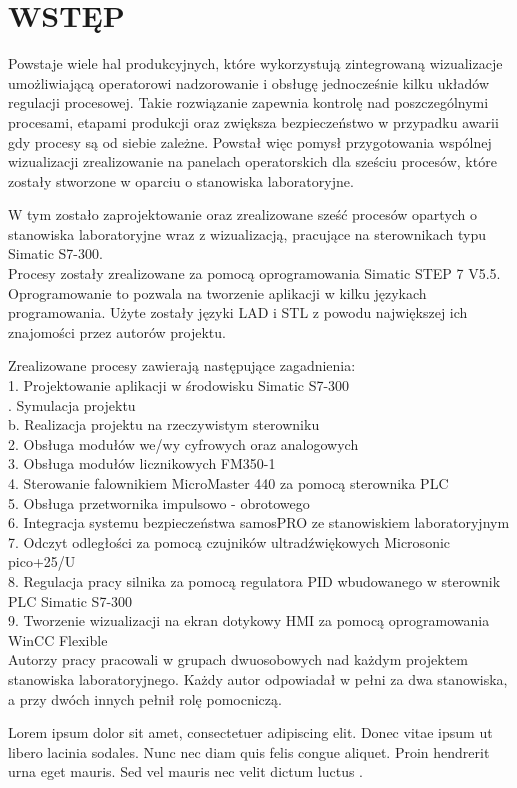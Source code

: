 \chapter{WSTĘP}



Powstaje wiele hal produkcyjnych, które wykorzystują zintegrowaną wizualizacje umożliwiającą operatorowi nadzorowanie i obsługę jednocześnie kilku układów regulacji procesowej. Takie rozwiązanie zapewnia kontrolę nad poszczególnymi procesami, etapami produkcji oraz zwiększa bezpieczeństwo w przypadku awarii gdy procesy są od siebie zależne. Powstał więc pomysł przygotowania wspólnej wizualizacji zrealizowanie na panelach operatorskich dla sześciu procesów, które zostały stworzone w oparciu o stanowiska laboratoryjne.

W tym zostało zaprojektowanie oraz zrealizowane sześć procesów opartych o stanowiska laboratoryjne wraz z wizualizacją, pracujące na sterownikach typu Simatic S7-300.
\\Procesy zostały zrealizowane za pomocą oprogramowania Simatic STEP 7 V5.5. Oprogramowanie to pozwala na tworzenie aplikacji w kilku językach programowania. Użyte zostały języki LAD i STL z powodu największej ich znajomości przez autorów projektu.

Zrealizowane procesy zawierają następujące zagadnienia:
\\1. Projektowanie aplikacji w środowisku Simatic S7-300\\
\a. Symulacja projektu\\
b. Realizacja projektu na rzeczywistym sterowniku\\
2. Obsługa modułów we/wy cyfrowych oraz analogowych\\
3. Obsługa modułów licznikowych FM350-1\\
4. Sterowanie falownikiem MicroMaster 440 za pomocą sterownika PLC\\
5. Obsługa przetwornika impulsowo - obrotowego\\
6. Integracja systemu bezpieczeństwa samosPRO ze stanowiskiem laboratoryjnym\\
7. Odczyt odległości za pomocą czujników ultradźwiękowych Microsonic pico+25/U\\
8. Regulacja pracy silnika za pomocą regulatora PID wbudowanego w sterownik PLC Simatic S7-300\\
9. Tworzenie wizualizacji na ekran dotykowy HMI za pomocą oprogramowania WinCC Flexible\\


Autorzy pracy pracowali w grupach dwuosobowych nad każdym projektem stanowiska laboratoryjnego. Każdy autor odpowiadał w pełni za dwa stanowiska, a przy dwóch innych pełnił rolę pomocniczą.

Lorem ipsum dolor sit amet, consectetuer adipiscing elit. Donec vitae ipsum ut
libero lacinia sodales. Nunc nec diam quis felis congue aliquet. Proin hendrerit
urna eget mauris. Sed vel mauris nec velit dictum luctus
\cite{diduce:DiduceBugs}.


